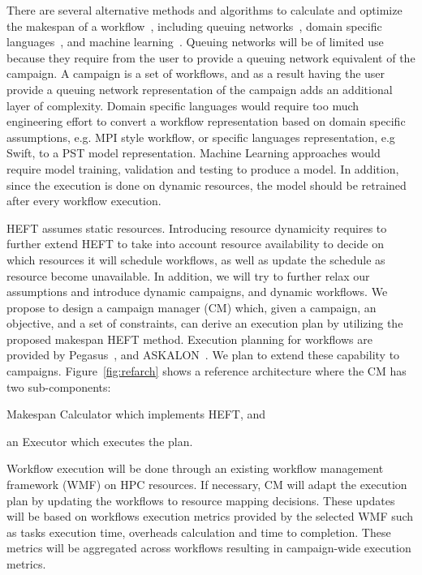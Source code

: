 There are several alternative methods and algorithms to calculate and optimize the makespan of a workflow~\cite{lu2019review}, including queuing networks~\cite{yao2019throughput,bao2019performance}, domain specific languages~\cite{carothers2017durango,maheshwari2016workflow}, and machine learning~\cite{witt2019predictive,pumma2017runtime}.
Queuing networks will be of limited use because they require from the user to provide a queuing network equivalent of the campaign.
A campaign is a set of workflows, and as a result having the user provide a queuing network representation of the campaign adds an additional layer of complexity.
Domain specific languages would require too much engineering effort to convert a workflow representation based on domain specific assumptions, e.g. MPI style workflow, or specific languages representation, e.g Swift, to a PST model representation.
Machine Learning approaches would require model training, validation and testing to produce a model.
In addition, since the execution is done on dynamic resources, the model should be retrained after every workflow execution.

HEFT assumes static resources.
Introducing resource dynamicity requires to further extend HEFT to take into account resource availability to decide on which resources it will schedule workflows, as well as update the schedule as resource become unavailable.
In addition, we will try to further relax our assumptions and introduce dynamic campaigns, and dynamic workflows.
We propose to design a campaign manager (CM) which, given a campaign, an objective, and a set of constraints, can derive an execution plan by utilizing the proposed makespan HEFT method.
Execution planning for workflows are provided by Pegasus~\cite{deelman2015pegasus}, and ASKALON~\cite{fahringer2005askalon}.
We plan to extend these capability to campaigns.
Figure~\ref{fig:refarch} shows a reference architecture where the CM has two sub-components:
\begin{inparaenum}[(1)]
\item Makespan Calculator which implements HEFT, and
\item an Executor which executes the plan. 
\end{inparaenum}
Workflow execution will be done through an existing workflow management framework (WMF) on HPC resources.
If necessary, CM will adapt the execution plan by updating the workflows to resource mapping decisions. 
These updates will be based on workflows execution metrics provided by the selected WMF such as tasks execution time, overheads calculation and time to completion.
These metrics will be aggregated across workflows resulting in campaign-wide execution metrics.

